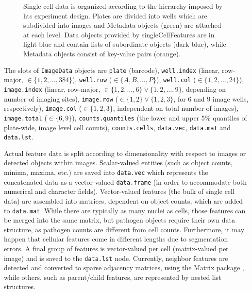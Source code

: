 \begin{figure}
  \caption[Data structure used for representing a complete plate of single cell data.]{Single cell data is organized according to the hierarchy imposed by \gls{hts} experiment design. Plates are divided into wells which are subdivided into images and Metadata objects (green) are attached at each level. Data objects provided by singleCellFeatures are in light blue and contain lists of subordinate objects (dark blue), while Metadata objects consist of key-value pairs (orange).}
  \label{fig:scf-platedata}
\end{figure}

The slots of \texttt{ImageData} objects are \texttt{plate} (barcode), \texttt{well.index} (linear, row-major, $\in \{ 1, 2, \dotsc, 384 \}$), \texttt{well.row} ($\in \{ A, B, \dotsc, P \}$), \texttt{well.col} ($\in \{ 1, 2, \dotsc, 24 \}$), \texttt{image.index} (linear, row-major, $\in \{ 1, 2, \dotsc, 6 \} \lor \{ 1, 2, \dotsc, 9 \}$, depending on number of imaging sites), \texttt{image.row} ($\in \{ 1, 2 \} \lor \{ 1, 2, 3 \}$, for 6 and 9 image wells, respectively), \texttt{image.col} ($\in \{ 1, 2, 3 \}$, independent on total number of images), \texttt{image.total} ($\in \{ 6, 9 \}$), \texttt{counts.quantiles} (the lower and upper 5\% quantiles of plate-wide, image level cell counts), \texttt{counts.cells}, \texttt{data.vec}, \texttt{data.mat} and \texttt{data.lst}.

Actual feature data is split according to dimensionality with respect to images or detected objects within images. Scalar-valued entities (such as object counts, minima, maxima, etc.) are saved into \texttt{data.vec} which represents the concatenated data as a vector-valued \texttt{data.frame} (in order to accommodate both numerical and character fields). Vector-valued features (the bulk of single cell data) are assembled into matrices, dependent on object counts, which are added to \texttt{data.mat}. While there are typically as many nuclei as cells, those features can be merged into the same matrix, but pathogen objects require their own data structure, as pathogen counts are different from cell counts. Furthermore, it may happen that cellular features come in different lengths due to segmentation errors. A final group of features is vector-valued per cell (matrix-valued per image) and is saved to the \texttt{data.lst} node. Currently, neighbor features are detected and converted to sparse adjacency matrices, using the Matrix package \citep{Bates2015}, while others, such as parent\slash child features, are represented by nested list structures.

